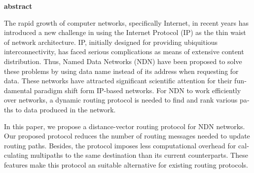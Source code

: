 

\pagestyle{empty}

\begin{latin}

\EnglishAbstractFont

\begin{center}
\textbf{abstract}
\end{center}

The rapid growth of computer networks, specifically Internet, in recent years has introduced a new challenge in using the Internet Protocol (IP) as the thin waist of network architecture. IP, initially designed for providing ubiquitious interconnectivity, has faced serious complications as means of extensive content distribution. Thus, Named Data Networks (NDN) have been proposed to solve these problems by using data name instead of its address when requesting for data. These networks have attracted significant scientific attention for their fundamental paradigm shift form IP-based networks. For NDN to work efficiently over networks, a dynamic routing protocol is needed to find and rank various paths to data produced in the network.

In this paper, we propose a distance-vector routing protocol for NDN networks. Our proposed protocol reduces the number of routing messages needed to update routing paths. Besides, the protocol imposes less computational overhead for calculating multipaths to the same destination than its current counterparts. These features make this protocol an suitable alternative for existing routing protocols.
\end{latin}

\newpage
